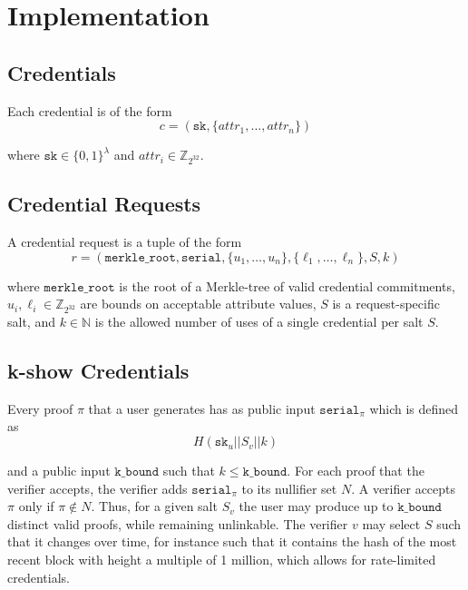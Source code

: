 \documentclass[11 pt]{extarticle}
\newcommand{\N}{\mathbb{N}}
\newcommand{\Z}{\mathbb{Z}}
\theoremstyle{remark}
\begin{document}
\section{Implementation}

\subsection{Credentials}
Each credential is of the form
\begin{equation*}
c =  ( \texttt{sk}, \{attr_1, \dots, attr_n\})
\end{equation*}

where $\texttt{sk} \in \{0, 1\}^\lambda$ and $attr_i \in \Z_{2^{32}}$.

\subsection{Credential Requests}
A credential request is a tuple of the form
\begin{equation*}
  r = (\texttt{merkle\_root}, \texttt{serial}, \{u_1, \dots,u_n\}, \{\ell_1,\dots,\ell_n\}, S, k)
\end{equation*}

where $\texttt{merkle\_root}$ is the root of a Merkle-tree of valid credential
commitments, $u_i, \ell_i \in \Z_{2^{32}}$ are bounds on acceptable attribute
values, $S$ is a request-specific salt, and $k\in \N$ is the allowed number of
uses of a single credential per salt $S$.

\subsection{k-show Credentials}
Every proof $\pi$ that a user generates has as public input
$\texttt{serial}_\pi$ which is defined as
\begin{equation*}
  H(\texttt{sk}_u || S_v || k)
\end{equation*}

and a public input $\texttt{k\_bound}$ such that $k\leq \texttt{k\_bound}$. For
each proof that the verifier accepts, the verifier adds $\texttt{serial}_\pi$ to
its nullifier set $N$. A verifier accepts $\pi$ only if $\pi \notin N$. Thus,
for a given salt $S_v$ the user may produce up to $\texttt{k\_bound}$ distinct
valid proofs, while remaining unlinkable. The verifier $v$ may select $S$ such
that it changes over time, for instance such that it contains the hash of the
most recent block with height a multiple of 1 million, which allows for
rate-limited credentials.
\end{document}
